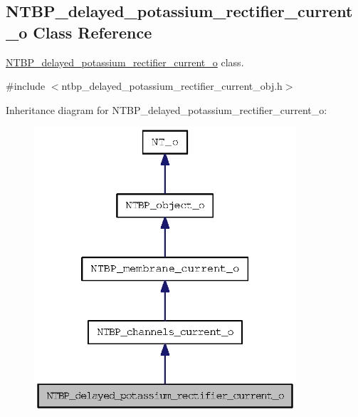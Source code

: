 \subsection{NTBP\_\-delayed\_\-potassium\_\-rectifier\_\-current\_\-o Class Reference}
\label{class_n_t_b_p__delayed__potassium__rectifier__current__o}


\hyperlink{class_n_t_b_p__delayed__potassium__rectifier__current__o}{NTBP\_\-delayed\_\-potassium\_\-rectifier\_\-current\_\-o} class.  




{\ttfamily \#include $<$ntbp\_\-delayed\_\-potassium\_\-rectifier\_\-current\_\-obj.h$>$}



Inheritance diagram for NTBP\_\-delayed\_\-potassium\_\-rectifier\_\-current\_\-o:
\nopagebreak
\begin{figure}[H]
\begin{center}
\leavevmode
\includegraphics[width=276pt]{class_n_t_b_p__delayed__potassium__rectifier__current__o__inherit__graph}
\end{center}
\end{figure}


